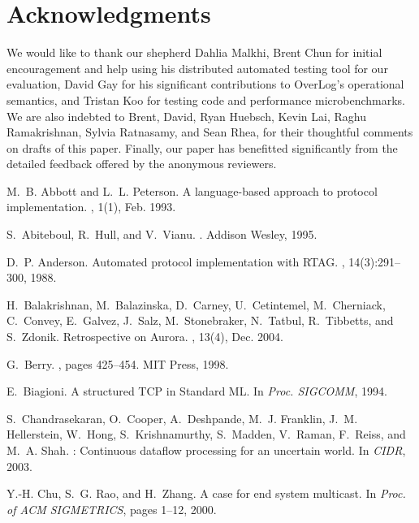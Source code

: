 \documentclass{sig-alt-full}
\def\Lang{OverLog\xspace}
\begin{document}
\section{Acknowledgments}
We would like to thank our shepherd Dahlia Malkhi, Brent Chun for initial
encouragement and help using 
his distributed automated testing tool for our evaluation,
David Gay for his significant contributions to \Lang's operational
semantics, and Tristan Koo for testing code and performance
microbenchmarks.  We are also indebted to Brent, David, Ryan Huebsch,
Kevin Lai, Raghu Ramakrishnan, Sylvia Ratnasamy, and Sean Rhea, for
their thoughtful comments on drafts of this paper. Finally, our paper
has benefitted significantly from the detailed feedback offered by the
anonymous reviewers. 

{\small
\begin{thebibliography}{10}

\vskip 12pt

M.~B. Abbott and L.~L. Peterson.
\newblock A language-based approach to protocol implementation.
, 1(1), Feb. 1993.

S.~Abiteboul, R.~Hull, and V.~Vianu.
.
\newblock Addison Wesley, 1995.

D.~P. Anderson.
\newblock Automated protocol implementation with {RTAG}.
, 14(3):291--300, 1988.

H.~Balakrishnan, M.~Balazinska, D.~Carney, U.~Cetintemel, M.~Cherniack,
  C.~Convey, E.~Galvez, J.~Salz, M.~Stonebraker, N.~Tatbul, R.~Tibbetts, and
  S.~Zdonik.
\newblock Retrospective on {A}urora.
, 13(4), Dec. 2004.

G.~Berry.
, pages 425--454.
\newblock MIT Press, 1998.

E.~Biagioni.
\newblock A structured {TCP} in {S}tandard {ML}.
\newblock In {\em Proc. SIGCOMM}, 1994.

S.~Chandrasekaran, O.~Cooper, A.~Deshpande, M.~J. Franklin, J.~M. Hellerstein,
  W.~Hong, S.~Krishnamurthy, S.~Madden, V.~Raman, F.~Reiss, and M.~A. Shah.
: Continuous dataflow processing for an uncertain world.
\newblock In {\em CIDR}, 2003.

Y.-H. Chu, S.~G. Rao, and H.~Zhang.
\newblock A case for end system multicast.
\newblock In {\em Proc. of ACM SIGMETRICS}, pages 1--12, 2000.


\end{thebibliography}}
\end{document}
